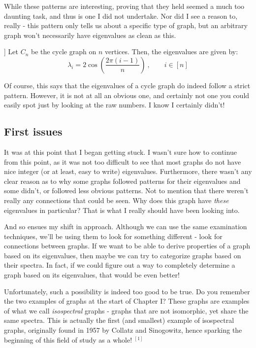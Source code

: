\documentclass{article}
\begin{document}
While these patterns are interesting, proving that they held seemed a much too daunting task, and thus is one I did not undertake.
Nor did I see a reason to, really - this pattern only tells us about a specific type of graph, but an arbitrary graph won't necessarily have eigenvalues as clean as this.

\def\augh{[1]}
\def\aaugh{[2]}
\begin{lm}[source=\aaugh]
Let $ C_{n} $ be the cycle graph on $ n $ vertices.
Then, the eigenvalues are given by:
\begin{equation*}
    \lambda_{i} = 2 \cos \left( \dfrac{2\pi(i - 1)}{n} \right) \ , \qquad i \in [n]
\end{equation*}
\end{lm}

Of course, this says that the eigenvalues of a cycle graph do indeed follow a strict pattern.
However, it is not at all an obvious one, and certainly not one you could easily spot just by looking at the raw numbers.
I know I certainly didn't!

\subsection{First issues}

It was at this point that I began getting stuck.
I wasn't sure how to continue from this point, as it was not too difficult to see that most graphs do not have nice integer (or at least, easy to write) eigenvalues.
Furthermore, there wasn't any clear reason as to why some graphs followed patterns for their eigenvalues and some didn't, or followed less obvious patterns.
Not to mention that there weren't really any connections that could be seen.
Why does this graph have \textit{these} eigenvalues in particular?
That is what I really should have been looking into.

And so ensues my shift in approach.
Although we can use the same examination techniques, we'll be using them to look for something different - look for connections between graphs.
If we want to be able to derive properties of a graph based on its eigenvalues, then maybe we can try to categorize graphs based on their spectra.
In fact, if we could figure out a way to completely determine a graph based on its eigenvalues, that would be even better!

Unfortunately, such a possibility is indeed too good to be true.
Do you remember the two examples of graphs at the start of Chapter I?
These graphs are examples of what we call \textit{isospectral} graphs - graphs that are not isomorphic, yet share the same spectra.
This is actually the first (and smallest) example of isospectral graphs, originally found in 1957 by Collatz and Sinogowitz, hence sparking the beginning of this field of study as a whole! $ ^{\augh} $
\end{document}
